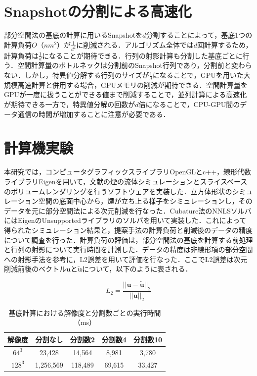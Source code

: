 \documentclass[a4j,12pt]{jreport}
\begin{document}
\section{Snapshotの分割による高速化}
部分空間法の基底の計算に用いるSnapshotを$d$分割することによって，基底1つの計算負荷$O（nm^2）$が$\frac{1}{d^2}$に削減される．アルゴリズム全体では$d$回計算するため，計算負荷は$\frac{1}{d}$になることが期待できる．行列の射影計算も分割した基底ごとに行う．空間計算量のボトルネックは分割前のSnapshot行列であり，分割前と変わらない．しかし，特異値分解する行列のサイズが$\frac{1}{d}$になることで，GPUを用いた大規模高速計算と併用する場合，GPUメモリの削減が期待できる．空間計算量をGPUが一度に扱うことができる値まで削減することで，並列計算による高速化が期待できる一方で，特異値分解の回数が$d$倍になることで，CPU-GPU間のデータ通信の時間が増加することに注意が必要である．


\section{計算機実験}
本研究では，コンピュータグラフィックスライブラリOpenGLとc++，線形代数ライブラリEigenを用いて，文献\cite{fedkiw}の煙の流体シミュレーションとスライスベースのボリュームレンダリングを行うソフトウェアを実装した．立方体形状のシミュレーション空間の底面中心から，煙が立ち上る様子をシミュレーションし，そのデータを元に部分空間法による次元削減を行なった．Cubature法のNNLSソルバにはEigenのUnsupportedライブラリのソルバを用いて実装した．これによって得られたシミュレーション結果と，提案手法の計算負荷と削減後のデータの精度について調査を行った．計算負荷の評価は，部分空間法の基底を計算する前処理と行列の射影について実行時間を計測した．データの精度は非線形項の部分空間への射影手法\cite{projection_base}を参考に，L2誤差を用いて評価を行なった．ここでL2誤差は次元削減前後のベクトル$\bm{u}$と$\bm{\tilde{u}}$について，以下のように表される．

\[
L_2 = \frac{|| \bm{u} - \bm{\tilde{u}} ||_2}{||  \bm{u} ||_2}
\]

\begin {table}[htbp]
    \centering
  \caption{基底計算における解像度と分割数ごとの実行時間（ms）}
  \label{tab:basis}
  \begin {tabular}{ccccc} \hline
    解像度 					&分割なし 		&分割数2			&分割数4 		&分割数10\\ \hline
    $64^3$ 					& 23,428 			&14,564	 		&8,981	 	&3,780\\
    $128^3$ 				& 1,256,569 		&118,489 			& 69,615 		&33,427\\ \hline
  \end {tabular}
\end {table}
\end{document}
